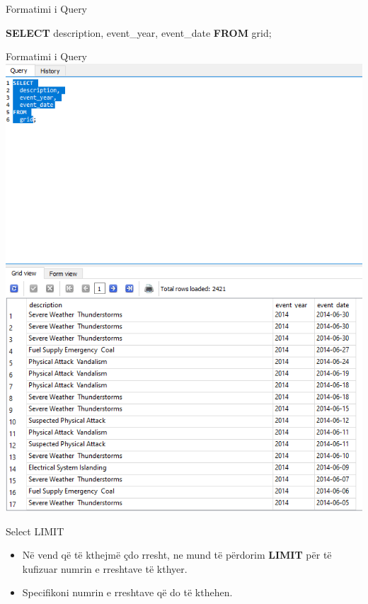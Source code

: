 \documentclass[
  ignorenonframetext,
]{beamer}
\newenvironment{Shaded}{\begin{snugshade}}{\end{snugshade}}
\newcommand{\KeywordTok}[1]{\textcolor[rgb]{0.13,0.29,0.53}{\textbf{#1}}}
\newcommand{\NormalTok}[1]{#1}
\begin{document}
\begin{frame}[fragile]{Formatimi i Query}
\label{formatimi-i-query-5}

\begin{Shaded}
\begin{Highlighting}[]
\KeywordTok{SELECT} 
\NormalTok{  description, }
\NormalTok{  event\_year, }
\NormalTok{  event\_date}
\KeywordTok{FROM} 
\NormalTok{  grid;}
\end{Highlighting}
\end{Shaded}
\end{frame}

\begin{frame}{Formatimi i Query}
\label{formatimi-i-query-6}
\includegraphics{./Figs/sql16.png}
\end{frame}

\begin{frame}{Select LIMIT}
\label{select-limit}
\begin{itemize}
\item
  Në vend që të kthejmë çdo rresht, ne mund të përdorim \textbf{LIMIT}
  për të kufizuar numrin e rreshtave të kthyer.
\item
  Specifikoni numrin e rreshtave që do të kthehen.
\end{itemize}
\end{frame}
\end{document}
